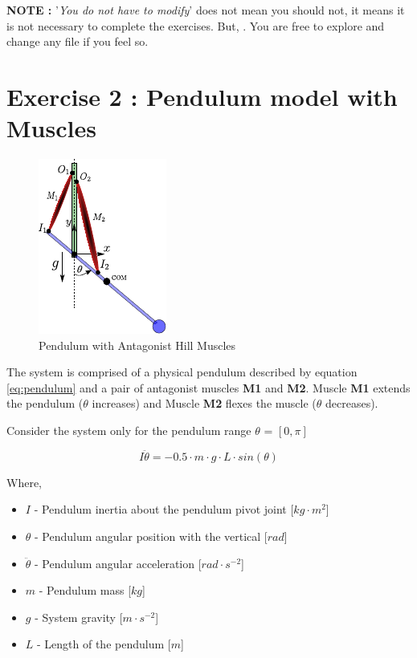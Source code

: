\documentclass{cmc}
\begin{document}
\textbf{NOTE : } '\textit{You do not have to modify}' does not mean
you should not, it means it is not necessary to complete the
exercises. But, . You are free to explore
and change any file if you feel so.

\section*{Exercise 2 : Pendulum model with Muscles}
\label{sec:question-1}

\begin{figure}[H]
  \centering \includegraphics[scale=2.0]{figures/pendulum_muscles.pdf}
  \caption{Pendulum with Antagonist Hill Muscles}
  \label{fig:p_muscles}
\end{figure}

The system is comprised of a physical pendulum described by equation
\ref{eq:pendulum} and a pair of antagonist muscles \textbf{M1} and
\textbf{M2}. Muscle \textbf{M1} extends the pendulum ($\theta$
increases) and Muscle \textbf{M2} flexes the muscle ($\theta$
decreases).

Consider the system only for the pendulum range $\theta$ = $[0, \pi]$

\begin{equation}
  \label{eq:pendulum}
  I\ddot{\theta} = -0.5 \cdot m \cdot g \cdot L \cdot sin(\theta)
\end{equation}

Where,

\begin{itemize}
\item $I$ - Pendulum inertia about the pendulum pivot joint
  [$kg \cdot m^2$]
\item $\theta$ - Pendulum angular position with the vertical [$rad$]
\item $\ddot{\theta}$ - Pendulum angular acceleration
  [$rad \cdot s^{-2}$]
\item $m$ - Pendulum mass [$kg$]
\item $g$ - System gravity [$m \cdot s^{-2}$]
\item $L$ - Length of the pendulum [$m$]
\end{itemize}
\end{document}
